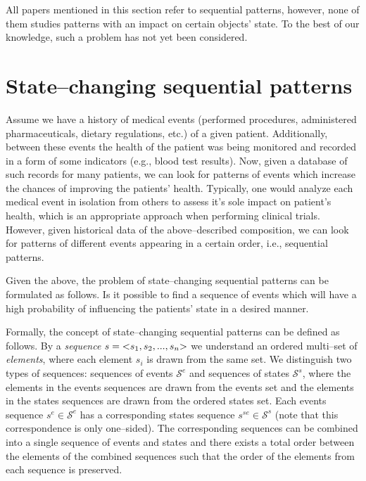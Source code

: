 \documentclass[runningheads,a4paper]{llncs}
\begin{document}
All papers mentioned in this section refer to sequential patterns, however, none of them studies patterns with an impact on certain objects' state.
To the best of our knowledge, such a problem has not yet been considered.

\section{State--changing sequential patterns}
\label{sec:main}
Assume we have a history of medical events (performed procedures, administered pharmaceuticals, dietary regulations, etc.) of a given patient.
Additionally, between these events the health of the patient was being monitored and recorded in a form of some indicators (e.g., blood test results).
Now, given a database of such records for many patients, we can look for patterns of events which increase the chances of improving the patients' health.
Typically, one would analyze each medical event in isolation from others to assess it's sole impact on patient's health, which is an appropriate approach when performing clinical trials.
However, given historical data of the above--described composition, we can look for patterns of different events appearing in a certain order, i.e., sequential patterns.

Given the above, the problem of state--changing sequential patterns can be formulated as follows.
Is it possible to find a sequence of events which will have a high probability of influencing the patients' state in a desired manner.

Formally, the concept of state--changing sequential patterns can be defined as follows.
By a \textit{sequence} $s=\text{\textless} s_1, s_2, ..., s_n\text{\textgreater}$ we understand an ordered multi--set of \textit{elements}, where each element $s_i$ is drawn from the same set.
We distinguish two types of sequences: sequences of events $\mathcal{S}^e$ and sequences of states $\mathcal{S}^s$, where the elements in the events sequences are drawn from the events set and the elements in the states sequences are drawn from the ordered states set.
Each events sequence $s^e\in\mathcal{S}^e$ has a corresponding states sequence $s^{se}\in\mathcal{S}^s$ (note that this correspondence is only one--sided).
The corresponding sequences can be combined into a single sequence of events and states and there exists a total order between the elements of the combined sequences such that the order of the elements from each sequence is preserved.
\end{document}

